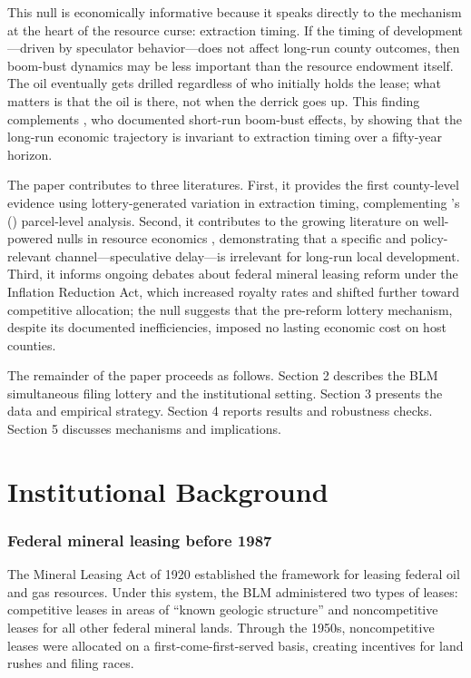 \documentclass[12pt]{article}
\begin{document}
This null is economically informative because it speaks directly to the mechanism at the heart of the resource curse: extraction timing. If the timing of development---driven by speculator behavior---does not affect long-run county outcomes, then boom-bust dynamics may be less important than the resource endowment itself. The oil eventually gets drilled regardless of who initially holds the lease; what matters is that the oil is there, not when the derrick goes up. This finding complements \citet{allcott2018dutch}, who documented short-run boom-bust effects, by showing that the long-run economic trajectory is invariant to extraction timing over a fifty-year horizon.

The paper contributes to three literatures. First, it provides the first county-level evidence using lottery-generated variation in extraction timing, complementing \citeauthor{brehm2021speculator}'s (\citeyear{brehm2021speculator}) parcel-level analysis. Second, it contributes to the growing literature on well-powered nulls in resource economics \citep{james2015resource, papyrakis2017resource}, demonstrating that a specific and policy-relevant channel---speculative delay---is irrelevant for long-run local development. Third, it informs ongoing debates about federal mineral leasing reform under the Inflation Reduction Act, which increased royalty rates and shifted further toward competitive allocation; the null suggests that the pre-reform lottery mechanism, despite its documented inefficiencies, imposed no lasting economic cost on host counties.

The remainder of the paper proceeds as follows. Section 2 describes the BLM simultaneous filing lottery and the institutional setting. Section 3 presents the data and empirical strategy. Section 4 reports results and robustness checks. Section 5 discusses mechanisms and implications.


\section{Institutional Background}

\subsubsection*{Federal mineral leasing before 1987} The Mineral Leasing Act of 1920 established the framework for leasing federal oil and gas resources. Under this system, the BLM administered two types of leases: competitive leases in areas of ``known geologic structure'' and noncompetitive leases for all other federal mineral lands. Through the 1950s, noncompetitive leases were allocated on a first-come-first-served basis, creating incentives for land rushes and filing races.
\end{document}

